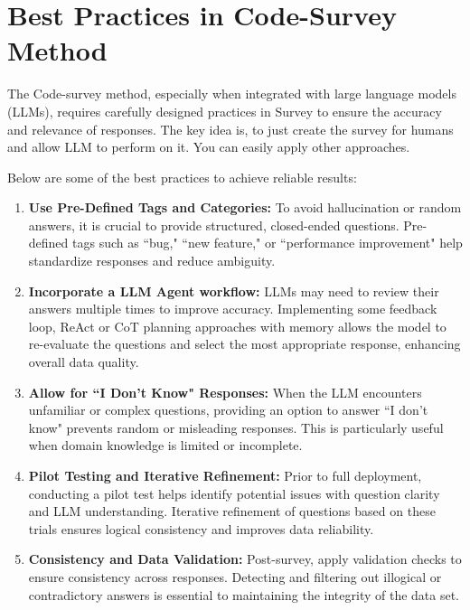 
\section{Best Practices in Code-Survey Method}

The Code-survey method, especially when integrated with large language models (LLMs), requires carefully designed practices in Survey to ensure the accuracy and relevance of responses. The key idea is, to just create the survey for humans and allow LLM to perform on it. You can easily apply other approaches.

Below are some of the best practices to achieve reliable results:

\begin{enumerate}
    \item \textbf{Use Pre-Defined Tags and Categories:} To avoid hallucination or random answers, it is crucial to provide structured, closed-ended questions. Pre-defined tags such as ``bug," ``new feature," or ``performance improvement" help standardize responses and reduce ambiguity.
    
    \item \textbf{Incorporate a LLM Agent workflow:} LLMs may need to review their answers multiple times to improve accuracy. Implementing some feedback loop, ReAct or CoT planning approaches with memory allows the model to re-evaluate the questions and select the most appropriate response, enhancing overall data quality.
    
    \item \textbf{Allow for ``I Don’t Know" Responses:} When the LLM encounters unfamiliar or complex questions, providing an option to answer ``I don’t know" prevents random or misleading responses. This is particularly useful when domain knowledge is limited or incomplete.
    
    \item \textbf{Pilot Testing and Iterative Refinement:} Prior to full deployment, conducting a pilot test helps identify potential issues with question clarity and LLM understanding. Iterative refinement of questions based on these trials ensures logical consistency and improves data reliability.
    
    \item \textbf{Consistency and Data Validation:} Post-survey, apply validation checks to ensure consistency across responses. Detecting and filtering out illogical or contradictory answers is essential to maintaining the integrity of the data set.
\end{enumerate}

